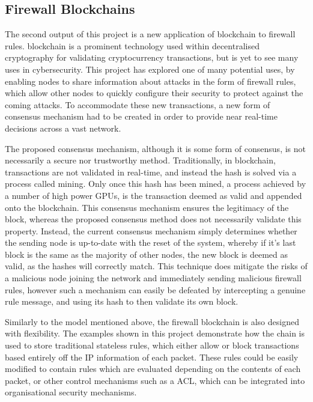 \documentclass[a4paper, 11pt]{report}
\begin{document}
\subsection{Firewall Blockchains}
The second output of this project is a new application of \gls{blockchain} to firewall rules. \Gls{blockchain} is a prominent technology used within decentralised cryptography for validating cryptocurrency transactions, but is yet to see many uses in cybersecurity. This project has explored one of many potential uses, by enabling nodes to share information about attacks in the form of firewall rules, which allow other nodes to quickly configure their security to protect against the coming attacks. To accommodate these new transactions, a new form of consensus mechanism had to be created in order to provide near real-time decisions across a vast network.

The proposed consensus mechanism, although it is some form of consensus, is not necessarily a secure nor trustworthy method. Traditionally, in \gls{blockchain}, transactions are not validated in real-time, and instead the hash is solved via a process called mining. Only once this hash has been mined, a process achieved by a number of high power \acrfull{GPU}s, is the transaction deemed as valid and appended onto the \gls{blockchain}. This consensus mechanism ensures the legitimacy of the block, whereas the proposed consensus method does not necessarily validate this property. Instead, the current consensus mechanism simply determines whether the sending node is up-to-date with the reset of the system, whereby if it's last block is the same as the majority of other nodes, the new block is deemed as valid, as the hashes will correctly match. This technique does mitigate the risks of a malicious node joining the network and immediately sending malicious firewall rules, however such a mechanism can easily be defeated by intercepting a genuine rule message, and using its hash to then validate its own block.

Similarly to the model mentioned above, the firewall \gls{blockchain} is also designed with flexibility. The examples shown in this project demonstrate how the chain is used to store traditional stateless rules, which either allow or block transactions based entirely off the \acrshort{IP} information of each packet. These rules could be easily modified to contain rules which are evaluated depending on the contents of each packet, or other control mechanisms such as a \acrfull{ACL}, which can be integrated into organisational security mechanisms.
\end{document}
